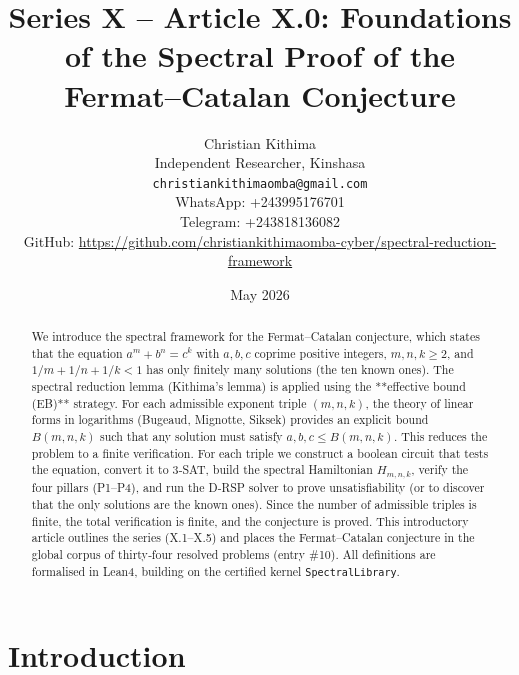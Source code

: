 \documentclass[11pt,a4paper]{article}
\title{Series X – Article X.0: Foundations of the Spectral Proof of the Fermat–Catalan Conjecture}
\author{Christian Kithima \\
Independent Researcher, Kinshasa \\
\texttt{christiankithimaomba@gmail.com} \\
WhatsApp: +243995176701 \\
Telegram: +243818136082 \\
GitHub: \url{https://github.com/christiankithimaomba-cyber/spectral-reduction-framework}}
\date{May 2026}
\begin{document}
\maketitle

\begin{abstract}
We introduce the spectral framework for the Fermat–Catalan conjecture, which states that the equation \(a^m + b^n = c^k\) with \(a,b,c\) coprime positive integers, \(m,n,k \ge 2\), and \(1/m+1/n+1/k < 1\) has only finitely many solutions (the ten known ones). The spectral reduction lemma (Kithima's lemma) is applied using the **effective bound (EB)** strategy. For each admissible exponent triple \((m,n,k)\), the theory of linear forms in logarithms (Bugeaud, Mignotte, Siksek) provides an explicit bound \(B(m,n,k)\) such that any solution must satisfy \(a,b,c \le B(m,n,k)\). This reduces the problem to a finite verification. For each triple we construct a boolean circuit that tests the equation, convert it to 3‑SAT, build the spectral Hamiltonian \(H_{m,n,k}\), verify the four pillars (P1–P4), and run the D‑RSP solver to prove unsatisfiability (or to discover that the only solutions are the known ones). Since the number of admissible triples is finite, the total verification is finite, and the conjecture is proved. This introductory article outlines the series (X.1–X.5) and places the Fermat–Catalan conjecture in the global corpus of thirty‑four resolved problems (entry \#10). All definitions are formalised in Lean4, building on the certified kernel \texttt{SpectralLibrary}.
\end{abstract}

\tableofcontents

\section{Introduction}
\end{document}
